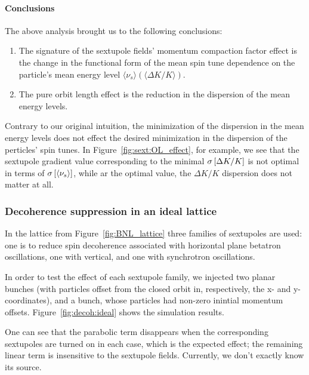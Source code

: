 \documentclass[preprint, review]{elsarticle}
\newcommand{\D}{\Delta}
\newcommand{\SD}[1]{\sigma\bkt*{#1}}
\newcommand{\avg}[1]{\langle{#1}\rangle}
\begin{document}
\paragraph{Conclusions}
The above analysis brought us to the following conclusions:
\begin{enumerate}[(1)]
\item The signature of the sextupole fields' momentum compaction factor effect is the change in the functional
  form of the mean spin tune dependence on the particle's mean energy level $\avg{\nu_s}(\avg{\D K/K})$.
  \item The pure orbit length effect is the reduction in the dispersion of the mean energy levels.
\end{enumerate}

Contrary to our original intuition, the minimization of the dispersion in the mean energy levels does not
effect the desired minimization in the dispersion of the perticles' spin tunes.
In Figure~\ref{fig:sext:OL_effect}, for example, we see that the sextupole gradient value corresponding to the
minimal $\SD{\D K/K}$ is not optimal in terms of $\SD{\avg{\nu_s}}$, while ar the optimal value,
the $\D K/K$ dispersion does not matter at all.

\subsubsection{Decoherence suppression in an ideal lattice}
In the lattice from Figure~\ref{fig:BNL_lattice} three families of sextupoles are used: one is to reduce spin
decoherence associated with horizontal plane betatron oscillations, one with vertical, and one with synchrotron
oscillations.

In order to test the effect of each sextupole family, we injected two planar bunches
(with particles offset from the closed orbit in, respectively, the x- and y-coordinates), and
a bunch, whose particles had non-zero inintial momentum offsets. Figure~\ref{fig:decoh:ideal}
shows the simulation results.

One can see that the parabolic term disappears when the corresponding sextupoles are turned on in each case,
which is the expected effect; the remaining linear term is insensitive to the sextupole fields. Currently,
we don't exactly know its source.
\end{document}

